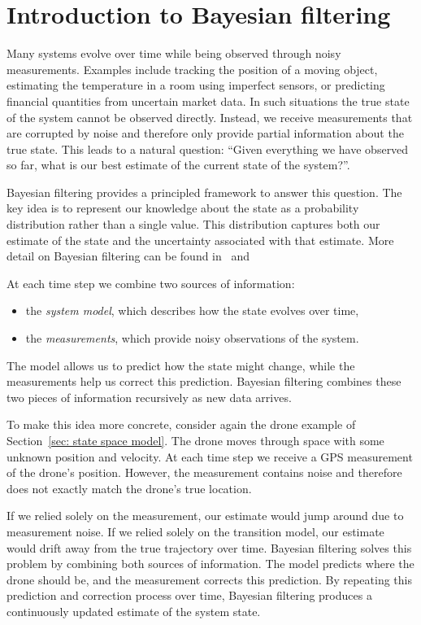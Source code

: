 \section{Introduction to Bayesian filtering}
Many systems evolve over time while being observed through noisy measurements. 
Examples include tracking the position of a moving object, estimating the temperature in a room using imperfect sensors, or predicting financial quantities from uncertain market data. In such situations the true state of the system cannot be observed directly.
Instead, we receive measurements that are corrupted by noise and therefore only provide partial information about the true state. This leads to a natural question: ``Given everything we have observed so far, what is our best estimate of the current state of the system?''.

Bayesian filtering provides a principled framework to answer this question. The key idea is to represent our knowledge about the state as a probability distribution rather than a single value. This distribution captures both our estimate of the state and the uncertainty associated with that estimate. More detail on Bayesian filtering can be found in~\cite[Ch.~4]{sarkka:bayesian_filtering} and~\cite[Ch.~1]{labbe:kalman_and_bayesian_filters}

At each time step we combine two sources of information:
\begin{itemize}
    \item the \textit{system model}, which describes how the state evolves over time,
    \item the \textit{measurements}, which provide noisy observations of the system.
\end{itemize}

The model allows us to predict how the state might change, while the measurements help us correct this prediction. Bayesian filtering combines these two pieces of information recursively as new data arrives.

To make this idea more concrete, consider again the drone example of Section~\ref{sec: state space model}. The drone moves through space with some unknown position and velocity. At each time step we receive a GPS measurement of the drone’s position. However, the measurement contains noise and therefore does not exactly match the drone’s true location.

If we relied solely on the measurement, our estimate would jump around due to measurement noise. If we relied solely on the transition model, our estimate would drift away from the true trajectory over time. Bayesian filtering solves this problem by combining both sources of information. The model predicts where the drone should be, and the measurement corrects this prediction. By repeating this prediction and correction process over time, Bayesian filtering produces a continuously updated estimate of the system state.

